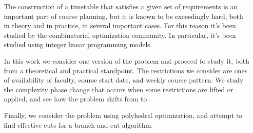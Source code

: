 The construction of a timetable that satisfies a given set of requirements is an important part of course planning, but it is known to be exceedingly hard, both in theory and in practice, in several important cases. For this reason it's been studied by the combinatorial optimization community. In particular, it's been studied using integer linear programming models.

In this work we consider one version of the problem and proceed to study it, both from a theoretical and practical standpoint. The restrictions we consider are ones of availability of faculty, course start date, and weekly course pattern. We study the complexity phase change that occurs when some restrictions are lifted or applied, and see how the problem shifts from \p to \npc.

Finally, we consider the problem using polyhedral optimization, and attempt to find effective cuts for a branch-and-cut algorithm.
